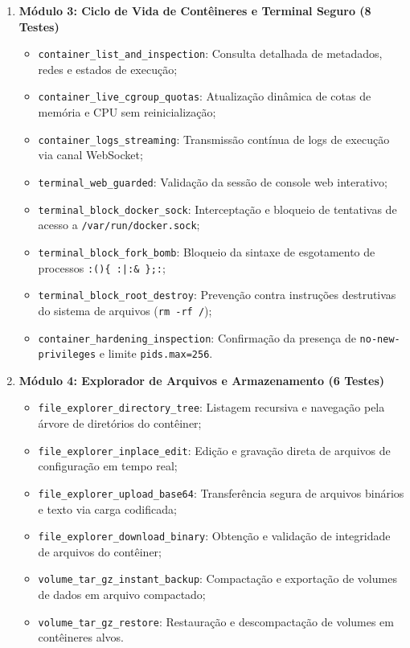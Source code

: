 \begin{enumerate}
    \item \textbf{Módulo 3: Ciclo de Vida de Contêineres e Terminal Seguro (8 Testes)}
    \begin{itemize}
        \item \texttt{container\_list\_and\_inspection}: Consulta detalhada de metadados, redes e estados de execução;
        \item \texttt{container\_live\_cgroup\_quotas}: Atualização dinâmica de cotas de memória e CPU sem reinicialização;
        \item \texttt{container\_logs\_streaming}: Transmissão contínua de logs de execução via canal WebSocket;
        \item \texttt{terminal\_web\_guarded}: Validação da sessão de console web interativo;
        \item \texttt{terminal\_block\_docker\_sock}: Interceptação e bloqueio de tentativas de acesso a \texttt{/var/run/docker.sock};
        \item \texttt{terminal\_block\_fork\_bomb}: Bloqueio da sintaxe de esgotamento de processos \texttt{:()\{ :|:\& \};:};
        \item \texttt{terminal\_block\_root\_destroy}: Prevenção contra instruções destrutivas do sistema de arquivos (\texttt{rm -rf /});
        \item \texttt{container\_hardening\_inspection}: Confirmação da presença de \texttt{no-new-privileges} e limite \texttt{pids.max=256}.
    \end{itemize}

    \item \textbf{Módulo 4: Explorador de Arquivos e Armazenamento (6 Testes)}
    \begin{itemize}
        \item \texttt{file\_explorer\_directory\_tree}: Listagem recursiva e navegação pela árvore de diretórios do contêiner;
        \item \texttt{file\_explorer\_inplace\_edit}: Edição e gravação direta de arquivos de configuração em tempo real;
        \item \texttt{file\_explorer\_upload\_base64}: Transferência segura de arquivos binários e texto via carga codificada;
        \item \texttt{file\_explorer\_download\_binary}: Obtenção e validação de integridade de arquivos do contêiner;
        \item \texttt{volume\_tar\_gz\_instant\_backup}: Compactação e exportação de volumes de dados em arquivo compactado;
        \item \texttt{volume\_tar\_gz\_restore}: Restauração e descompactação de volumes em contêineres alvos.
    \end{itemize}


\end{enumerate}
